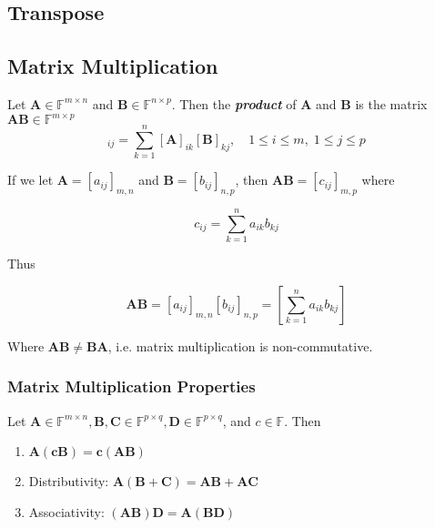 \documentclass{article}
\begin{document}
\subsection{Transpose}
\lipsum[1]

\subsection{Matrix Multiplication}
\begin{definition}
    Let $\mathbf{A} \in \mathbb{F}^{m\times n}$ and $\mathbf{B} \in \mathbb{F}^{n\times p}$. Then the \textbf{\textit{product}} of $\mathbf{A}$ and $\mathbf{B}$ is the matrix $\mathbf{AB} \in \mathbb{F}^{m\times p}$
    \begin{equation*}
        [\mathbf{AB}]_{ij} = \sum_{k=1}^{n} [\mathbf{A}]_{ik}[\mathbf{B}]_{kj}, \quad 1\leq i \leq m, \; 1\leq j\leq p 
    \end{equation*} 
\end{definition}

\noindent If we let $\mathbf{A} = [a_{ij}]_{m,n}$ and $\mathbf{B} = [b_{ij}]_{n,p}$, then $\mathbf{AB} = [c_{ij}]_{m,p}$ where 

\begin{equation*}
    c_{ij} = \sum_{k=1}^{n} a_{ik} b_{kj}   
\end{equation*}

\noindent Thus 

\begin{equation}
    \mathbf{AB} = [a_{ij}]_{m,n} [b_{ij}]_{n,p} = \left[\sum_{k=1}^{n} a_{ik} b_{kj} \right]
\end{equation}

\noindent Where $\mathbf{AB} \neq \mathbf{BA}$, i.e. matrix multiplication is non-commutative. 

\subsubsection{Matrix Multiplication Properties}
\begin{theorem}
    Let $\mathbf{A} \in \mathbb{F}^{m\times n}, \mathbf{B}, \mathbf{C} \in \mathbb{F}^{p\times q}, \mathbf{D} \in \mathbb{F}^{p\times q}$, and $c \in \mathbb{F}$. Then
    \begin{enumerate}
        \item $\mathbf{A(c \mathbf{B}) = c(\mathbf{AB})}$
        \item Distributivity: $\mathbf{A}(\mathbf{B + C}) = \mathbf{AB} + \mathbf{AC}$
        \item Associativity: $(\mathbf{AB})\mathbf{D} = \mathbf{A}(\mathbf{BD})$
    \end{enumerate}
\end{theorem}
\end{document}
